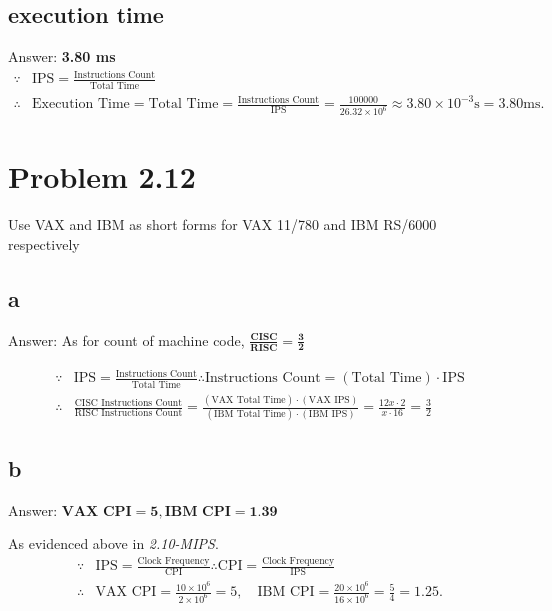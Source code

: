 \documentclass[11pt]{article}  %
\begin{document}
\subsection*{execution time}
    Answer: \textbf{3.80 ms}
    $$
    \begin{aligned}
        \because & \text{IPS} = \frac{\text{Instructions Count}}{\text{Total Time}} \\
        \therefore &\text{Execution Time} = \text{Total Time} = \frac{\text{Instructions Count}}{\text{IPS}} = 
            \frac{100000}{26.32 \times 10^6} \approx 3.80\times 10^{-3}\text{s} = 3.80\text{ms}.
    \end{aligned}
    $$

\section*{Problem 2.12}
    Use VAX and IBM as short forms for VAX 11/780 and IBM RS/6000 respectively
\subsection*{a}
    Answer: As for count of machine code, 
    $\displaystyle \mathbf{\frac{\textbf{CISC}}{\textbf{RISC}} = \frac{3}{2}}$

    $$
    \begin{aligned}
        \because  &\text{IPS} = \frac{\text{Instructions Count}}{\text{Total Time}} 
        \therefore \text{Instructions Count} = \left(\text{Total Time}\right) \cdot \text{IPS}\\
        \therefore &\frac{\text{CISC Instructions Count}}{\text{RISC Instructions Count}} = 
            \frac{\left(\text{VAX Total Time}\right) \cdot \left(\text{VAX IPS}\right)}
            {\left(\text{IBM Total Time}\right) \cdot \left(\text{IBM IPS}\right)}
            = \frac{12x\cdot 2}{x \cdot 16} = \frac{3}{2} 
    \end{aligned}
    $$

\subsection*{b}
    Answer: $\displaystyle \textbf{VAX CPI} = \textbf{5}, \textbf{IBM CPI} = \textbf{1.39}$

    As evidenced above in \textit{2.10-MIPS}.
    $$
    \begin{aligned}
        \because & \text{IPS} = \frac{\text{Clock Frequency}}{\text{CPI}}
        \therefore \text{CPI} = \frac{\text{Clock Frequency}}{\text{IPS}} \\ 
        \therefore &\text{VAX CPI} = \frac{10\times 10^6}{2\times 10^6} = 5, \quad
        \text{IBM CPI} = \frac{20\times 10^6}{16\times 10^6} = \frac{5}{4} = 1.25. 
    \end{aligned}
    $$
\end{document}
